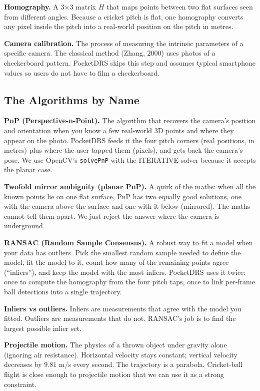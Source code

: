 \documentclass[11pt,a4paper]{article}
\begin{document}
\textbf{Homography.} A 3$\times$3 matrix $H$ that maps points between two flat surfaces seen from different angles. Because a cricket pitch is flat, one homography converts any pixel inside the pitch into a real-world position on the pitch in metres.

\textbf{Camera calibration.} The process of measuring the intrinsic parameters of a specific camera. The classical method (Zhang, 2000) uses photos of a checkerboard pattern. PocketDRS skips this step and assumes typical smartphone values so users do not have to film a checkerboard.

\subsection{The Algorithms by Name}

\textbf{PnP (Perspective-n-Point).} The algorithm that recovers the camera's position and orientation when you know a few real-world 3D points and where they appear on the photo. PocketDRS feeds it the four pitch corners (real positions, in metres) plus where the user tapped them (pixels), and gets back the camera's pose. We use OpenCV's \texttt{solvePnP} with the ITERATIVE solver because it accepts the planar case.

\textbf{Twofold mirror ambiguity (planar PnP).} A quirk of the maths: when all the known points lie on one flat surface, PnP has two equally good solutions, one with the camera above the surface and one with it below (mirrored). The maths cannot tell them apart. We just reject the answer where the camera is underground.

\textbf{RANSAC (Random Sample Consensus).} A robust way to fit a model when your data has outliers. Pick the smallest random sample needed to define the model, fit the model to it, count how many of the remaining points agree (``inliers''), and keep the model with the most inliers. PocketDRS uses it twice: once to compute the homography from the four pitch taps, once to link per-frame ball detections into a single trajectory.

\textbf{Inliers vs outliers.} Inliers are measurements that agree with the model you fitted. Outliers are measurements that do not. RANSAC's job is to find the largest possible inlier set.

\textbf{Projectile motion.} The physics of a thrown object under gravity alone (ignoring air resistance). Horizontal velocity stays constant; vertical velocity decreases by $9.81$ m/s every second. The trajectory is a parabola. Cricket-ball flight is close enough to projectile motion that we can use it as a strong constraint.
\end{document}

